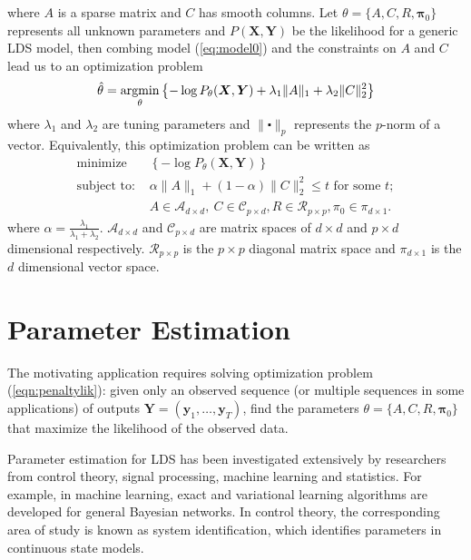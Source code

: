 \documentclass[fleqn,12pt]{article}
\let\oldref\ref
\renewcommand{\ref}[1]{(\oldref{#1})}
\newcommand{\argmin}{\operatornamewithlimits{argmin}}
\providecommand{\mb}[1]{\boldsymbol{#1}}
\newcommand{\by}{\mb{y}}
\newcommand{\bX}{\mb{X}}
\newcommand{\bY}{\mb{Y}}
\begin{document}
where $A$ is a sparse matrix and $C$ has smooth columns.
Let $\theta =\{A,C,R,\mathbf{\pi}_0\}$ represents all unknown parameters and $P(\bX,\bY)$ be the likelihood for a generic LDS model, then combing model \ref{eq:model0} and the constraints on $A$ and $C$ lead us to an optimization problem
\begin{equation}\label{eqn:penaltylik}
\hat{\theta}=\argmin_{\substack{\theta}}\left\{-\log P_\theta(\bX,\bY)+\lambda_1\|A\|_1+\lambda_2\|C\|_2^2\right\}
\end{equation}
where $\lambda_1$ and $\lambda_2$ are tuning parameters and $\|\centerdot\|_p$ represents the $p$-norm of a vector. Equivalently, this optimization problem can be written as
\begin{equation}\label{eqn:penaltylikdual}
\begin{aligned}
&\text{minimize}&\left\{-\log P_\theta(\bX,\bY)\right\}&\\
&\text{subject to: }
& \alpha\|A\|_1+ (1-\alpha)\|C\|_2^2 \leq t \text{ for some }t; &\\
&& A\in \mathcal{A}_{d\times d},\ C \in \mathcal{C}_{p \times d}, R \in \mathcal{R}_{p\times p}, \pi_0 \in \mathcal{\pi}_{d\times 1}.&
\end{aligned}
\end{equation}
where $\alpha = \frac{\lambda_1}{\lambda_1 + \lambda_2}$. $\mathcal{A}_{d\times d}$ and $\mathcal{C}_{p \times d}$ are matrix spaces of $d\times d$ and $p \times d$ dimensional respectively. $\mathcal{R}_{p \times p}$ is the $p \times p$ diagonal matrix space and $\mathcal{\pi}_{d\times 1}$ is the $d$ dimensional vector space.
\section{Parameter Estimation}
The motivating application requires solving optimization problem \ref{eqn:penaltylik}: given only an observed sequence (or multiple sequences in some applications) of outputs $\bY=(\by_1,\ldots,\by_T)$, find the parameters $\theta=\{A,C,R,\mathbf{\pi}_0\}$ that maximize the likelihood of the observed data.

Parameter estimation for LDS has been investigated extensively by researchers from control theory, signal processing, machine learning and statistics. For example, in machine learning, exact and variational learning algorithms are developed for general Bayesian networks. In control theory, the corresponding area of study is known as system identification, which identifies parameters in continuous state models.
\end{document}
